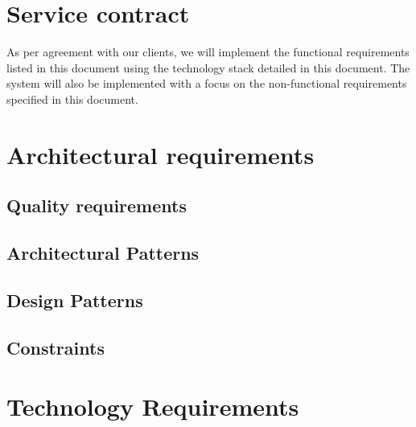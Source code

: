 \documentclass{article}
\begin{document}
	
	\newpage
	
	\section*{Service contract}	
	As per agreement with our clients, we will implement the functional requirements listed in this document using the technology stack detailed in this document. The system will also be implemented with a focus on the non-functional requirements specified in this document.
	
	\section*{Architectural requirements}
	
	\subsection*{Quality requirements}	
	\subsection*{Architectural Patterns}	
	\subsection*{Design Patterns}	
	\subsection*{Constraints}	
	
	\newpage
	\section*{Technology Requirements}
	
	
\end{document}
